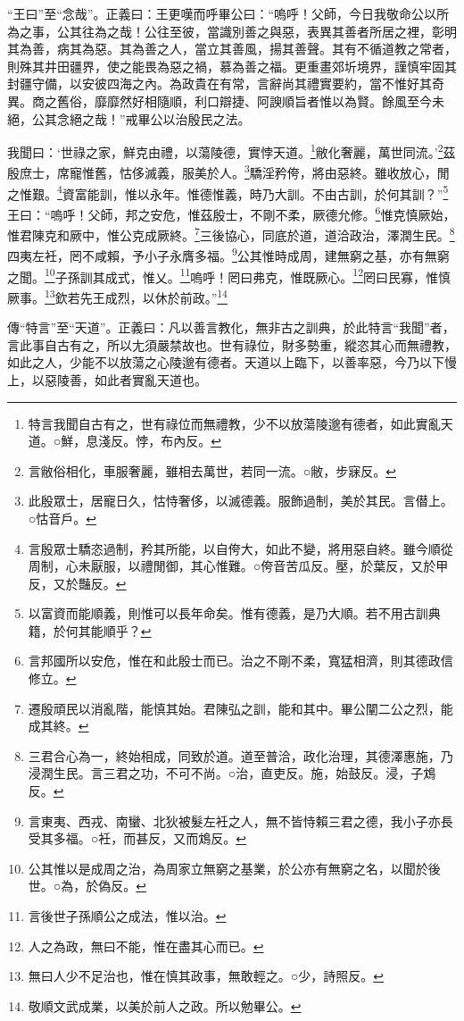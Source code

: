 {\noindent\shu{}\fzkt “王曰”至“念哉”。正義曰：王更嘆而呼畢公曰：“嗚呼！父師，今日我敬命公以所為之事，公其往為之哉！公往至彼，當識別善之與惡，表異其善者所居之裡，彰明其為善，病其為惡。其為善之人，當立其善風，揚其善聲。其有不循道教之常者，則殊其井田疆界，使之能畏為惡之禍，慕為善之福。更重畫郊圻境界，謹慎牢固其封疆守備，以安彼四海之內。為政貴在有常，言辭尚其禮實要約，當不惟好其奇異。商之舊俗，靡靡然好相隨順，利口辯捷、阿諛順旨者惟以為賢。餘風至今未絕，公其念絕之哉！”戒畢公以治殷民之法。 \par}

我聞曰：‘世祿之家，鮮克由禮，以蕩陵德，實悖天道。\footnote{特言我聞自古有之，世有祿位而無禮教，少不以放蕩陵邈有德者，如此實亂天道。○鮮，息淺反。悖，布內反。}敝化奢麗，萬世同流。’\footnote{言敝俗相化，車服奢麗，雖相去萬世，若同一流。○敝，步寐反。}茲殷庶士，席寵惟舊，怙侈滅義，服美於人。\footnote{此殷眾士，居寵日久，怙恃奢侈，以滅德義。服飾過制，美於其民。言僣上。○怙音戶。}驕淫矜侉，將由惡終。雖收放心，閒之惟艱。\footnote{言殷眾士驕恣過制，矜其所能，以自侉大，如此不變，將用惡自終。雖今順從周制，心未厭服，以禮閒御，其心惟難。○侉音苦瓜反。壓，於葉反，又於甲反，又於豔反。}資富能訓，惟以永年。惟德惟義，時乃大訓。不由古訓，於何其訓？”\footnote{以富資而能順義，則惟可以長年命矣。惟有德義，是乃大順。若不用古訓典籍，於何其能順乎？}王曰：“嗚呼！父師，邦之安危，惟茲殷士，不剛不柔，厥德允修。\footnote{言邦國所以安危，惟在和此殷士而已。治之不剛不柔，寬猛相濟，則其德政信修立。}惟克慎厥始，惟君陳克和厥中，惟公克成厥終。\footnote{遷殷頑民以消亂階，能慎其始。君陳弘之訓，能和其中。畢公闡二公之烈，能成其終。}三後協心，同底於道，道洽政治，澤潤生民。\footnote{三君合心為一，終始相成，同致於道。道至普洽，政化治理，其德澤惠施，乃浸潤生民。言三君之功，不可不尚。○治，直吏反。施，始鼓反。浸，子鴆反。}四夷左衽，罔不咸賴，予小子永膺多福。\footnote{言東夷、西戎、南蠻、北狄被髮左衽之人，無不皆恃賴三君之德，我小子亦長受其多福。○衽，而甚反，又而鴆反。}公其惟時成周，建無窮之基，亦有無窮之聞。\footnote{公其惟以是成周之治，為周家立無窮之基業，於公亦有無窮之名，以聞於後世。○為，於偽反。}子孫訓其成式，惟乂。\footnote{言後世子孫順公之成法，惟以治。}嗚呼！罔曰弗克，惟既厥心。\footnote{人之為政，無曰不能，惟在盡其心而已。}罔曰民寡，惟慎厥事。\footnote{無曰人少不足治也，惟在慎其政事，無敢輕之。○少，詩照反。}欽若先王成烈，以休於前政。”\footnote{敬順文武成業，以美於前人之政。所以勉畢公。}


{\noindent\zhuan{}\fzbyks 傳“特言”至“天道”。正義曰：凡以善言教化，無非古之訓典，於此特言“我聞”者，言此事自古有之，所以尢須嚴禁故也。世有祿位，財多勢重，縱恣其心而無禮教，如此之人，少能不以放蕩之心陵邈有德者。天道以上臨下，以善率惡，今乃以下慢上，以惡陵善，如此者實亂天道也。 \par}

